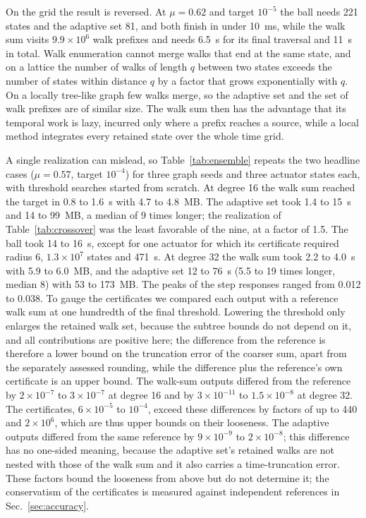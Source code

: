 \documentclass[aps,pra,superscriptaddress,floatfix,longbibliography,twocolumn]{revtex4-2}
\begin{document}
On the grid the result is reversed. At $\mu=0.62$ and target $10^{-5}$ the ball needs 221 states and the adaptive set 81, and both finish in under 10~ms, while the walk sum visits $9.9\times10^6$ walk prefixes and needs 6.5~s for its final traversal and 11~s in total. Walk enumeration cannot merge walks that end at the same state, and on a lattice the number of walks of length $q$ between two states exceeds the number of states within distance $q$ by a factor that grows exponentially with $q$. On a locally tree-like graph few walks merge, so the adaptive set and the set of walk prefixes are of similar size. The walk sum then has the advantage that its temporal work is lazy, incurred only where a prefix reaches a source, while a local method integrates every retained state over the whole time grid.

A single realization can mislead, so Table~\ref{tab:ensemble} repeats the two headline cases ($\mu=0.57$, target $10^{-4}$) for three graph seeds and three actuator states each, with threshold searches started from scratch. At degree 16 the walk sum reached the target in 0.8 to 1.6~s with 4.7 to 4.8~MB. The adaptive set took 1.4 to 15~s and 14 to 99~MB, a median of 9 times longer; the realization of Table~\ref{tab:crossover} was the least favorable of the nine, at a factor of 1.5. The ball took 14 to 16~s, except for one actuator for which its certificate required radius 6, $1.3\times10^7$ states and 471~s. At degree 32 the walk sum took 2.2 to 4.0~s with 5.9 to 6.0~MB, and the adaptive set 12 to 76~s (5.5 to 19 times longer, median 8) with 53 to 173~MB. The peaks of the step responses ranged from 0.012 to 0.038. To gauge the certificates we compared each output with a reference walk sum at one hundredth of the final threshold. Lowering the threshold only enlarges the retained walk set, because the subtree bounds do not depend on it, and all contributions are positive here; the difference from the reference is therefore a lower bound on the truncation error of the coarser sum, apart from the separately assessed rounding, while the difference plus the reference's own certificate is an upper bound. The walk-sum outputs differed from the reference by $2\times10^{-7}$ to $3\times10^{-7}$ at degree 16 and by $3\times10^{-11}$ to $1.5\times10^{-8}$ at degree 32. The certificates, $6\times10^{-5}$ to $10^{-4}$, exceed these differences by factors of up to 440 and $2\times10^6$, which are thus upper bounds on their looseness. The adaptive outputs differed from the same reference by $9\times10^{-9}$ to $2\times10^{-8}$; this difference has no one-sided meaning, because the adaptive set's retained walks are not nested with those of the walk sum and it also carries a time-truncation error. These factors bound the looseness from above but do not determine it; the conservatism of the certificates is measured against independent references in Sec.~\ref{sec:accuracy}.
\end{document}

